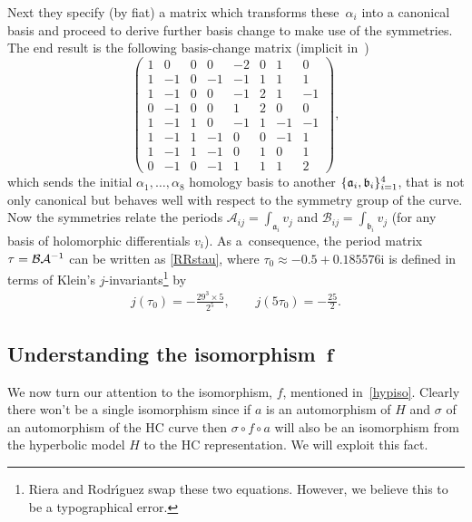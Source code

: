 \documentclass[pdftex]{sigma}
\numberwithin{equation}{section}
\newcommand{\mi}{\mathrm{i}}
\begin{document}
Next they specify (by f\/iat) a matrix which transforms these~$\alpha_i$
into a canonical basis and proceed to derive further basis change to
make use of the symmetries. The end result is the following
basis-change matrix (implicit in~\cite{riera})
\begin{equation}
  \label{basistrans}
  \begin{pmatrix}
  1 & 0  & 0 & 0  & -2 & 0 & 1  & 0  \\
  1 & -1 & 0 & -1 & -1 & 1 & 1  & 1  \\
  1 & -1 & 0 & 0  & -1 & 2 & 1  & -1 \\
  0 & -1 & 0 & 0  & 1  & 2 & 0  & 0  \\
  1 & -1 & 1 & 0  & -1 & 1 & -1 & -1 \\
  1 & -1 & 1 & -1 & 0  & 0 & -1 & 1  \\
  1 & -1 & 1 & -1 & 0  & 1 & 0  & 1  \\
  0 & -1 & 0 & -1 & 1  & 1 & 1  & 2
  \end{pmatrix},
\end{equation}
which sends the initial $\alpha_1,\dots,\alpha_{8}$ homology basis to
another $\{\mathfrak{a}_i,\mathfrak{b}_i\}_{i=1}\sp{4}$, that is not only canonical but behaves well with respect to
the symmetry group of the curve. Now the symmetries relate the periods $\mathcal{A}_{ij}=\int_{\mathfrak{a}_i}v_j$ and
$\mathcal{B}_{ij}=\int_{\mathfrak{b}_i}v_j$ (for any basis of holomorphic dif\/ferentials $v_i$).
As a~consequence, the period matrix $\tau=\mathcal{B}\mathcal{A}\sp{-1}$
can be
written as \eqref{RRstau},
where $\tau_0 \approx -0.5+0.185576\mi$ is def\/ined in terms of
Klein's $j$-invariants\footnote{Riera and Rodr{\'{\i}}guez swap these two
equations. However, we believe this to be a typographical error.} by
\begin{gather}\label{deftau0}
  j(\tau_0) = -\frac{29^3\times 5}{2^5}, \qquad
  j(5\tau_0) = -\frac{25}{2}.
\end{gather}


\subsection[Understanding the isomorphism $f$]{Understanding the isomorphism~$\boldsymbol{f}$}\label{section4.3}

We now turn our attention to the isomorphism, $f$, mentioned in~\eqref{hypiso}. Clearly  there won't be a single isomorphism
since if $a$ is an automorphism of $H$ and $\sigma$ of an automorphism of
the HC
curve then $\sigma\circ f \circ a$ will also be an
isomorphism from the hyperbolic model $H$ to the HC
representation. We will exploit this fact.
\end{document}
